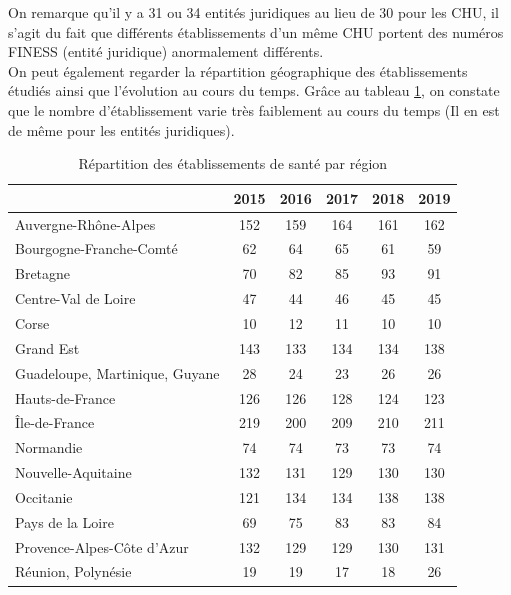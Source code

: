 \bigskip

On remarque qu'il y a 31 ou 34 entités juridiques au lieu de 30 pour les CHU, il s'agit du fait que différents établissements d'un même CHU portent des numéros FINESS (entité juridique) anormalement différents.\\


On peut également regarder la répartition géographique des établissements étudiés ainsi que l'évolution au cours du temps. Grâce au tableau \ref{tri_reg}, on constate que le nombre d'établissement varie très faiblement au cours du temps (Il en est de même pour les entités juridiques).

\clearpage



\begin{table}[!ht]
\centering
\caption{Répartition des établissements de santé par région} 
\label{tri_reg}
\begin{tabular}{l|ccccc}
  \hline
 & 2015 & 2016 & 2017 & 2018 & 2019 \\ 
  \hline
Auvergne-Rhône-Alpes & 152 & 159 & 164 & 161 & 162 \\ 
  Bourgogne-Franche-Comté &  62 &  64 &  65 &  61 &  59 \\ 
  Bretagne &  70 &  82 &  85 &  93 &  91 \\ 
  Centre-Val de Loire &  47 &  44 &  46 &  45 &  45 \\ 
  Corse &  10 &  12 &  11 &  10 &  10 \\ 
  Grand Est & 143 & 133 & 134 & 134 & 138 \\ 
  Guadeloupe, Martinique, Guyane &  28 &  24 &  23 &  26 &  26 \\ 
  Hauts-de-France & 126 & 126 & 128 & 124 & 123 \\ 
  Île-de-France & 219 & 200 & 209 & 210 & 211 \\ 
  Normandie &  74 &  74 &  73 &  73 &  74 \\ 
  Nouvelle-Aquitaine & 132 & 131 & 129 & 130 & 130 \\ 
  Occitanie & 121 & 134 & 134 & 138 & 138 \\ 
  Pays de la Loire &  69 &  75 &  83 &  83 &  84 \\ 
  Provence-Alpes-Côte d'Azur & 132 & 129 & 129 & 130 & 131 \\ 
  Réunion, Polynésie &  19 &  19 &  17 &  18 &  26 \\ 
   \hline
\end{tabular}
\end{table}


